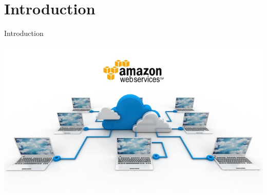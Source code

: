 \section*{Introduction}
\begin{frame}{Introduction}
\begin{center}
    \includegraphics[scale=0.4]{figures/Amazon.jpg}
\end{center}
\end{frame}